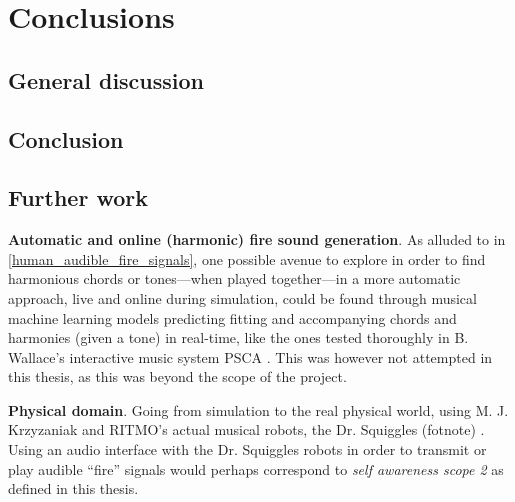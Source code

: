\chapter{Conclusions} %
\label{chap:conclusions}







\section{General discussion}



\section{Conclusion}



\section{Further work}

\textbf{Automatic and online (harmonic) fire sound generation}. As alluded to in \ref{human_audible_fire_signals}, one possible avenue to explore in order to find harmonious chords or tones—when played together—in a more automatic approach, live and online during simulation, could be found through musical machine learning models predicting fitting and accompanying chords and harmonies (given a tone) in real-time, like the ones tested thoroughly in B. Wallace's interactive music system PSCA \cite{wallace_PSCA}. This was however not attempted in this thesis, as this was beyond the scope of the project.

\textbf{Physical domain}. Going from simulation to the real physical world, using M. J. Krzyzaniak and RITMO's  actual musical robots, the Dr. Squiggles (fotnote) \cite{dr_squiggles}. Using an audio interface with the Dr. Squiggles robots in order to transmit or play audible ``fire'' signals would perhaps correspond to \textit{self awareness scope 2} as defined in this thesis.

